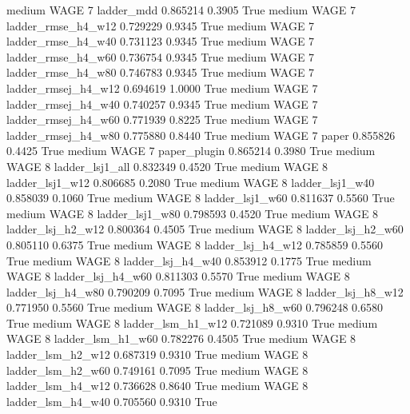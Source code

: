     medium     WAGE                 7          ladder_mdd   0.865214      0.3905    True
    medium     WAGE                 7  ladder_rmse_h4_w12   0.729229      0.9345    True
    medium     WAGE                 7  ladder_rmse_h4_w40   0.731123      0.9345    True
    medium     WAGE                 7  ladder_rmse_h4_w60   0.736754      0.9345    True
    medium     WAGE                 7  ladder_rmse_h4_w80   0.746783      0.9345    True
    medium     WAGE                 7 ladder_rmsej_h4_w12   0.694619      1.0000    True
    medium     WAGE                 7 ladder_rmsej_h4_w40   0.740257      0.9345    True
    medium     WAGE                 7 ladder_rmsej_h4_w60   0.771939      0.8225    True
    medium     WAGE                 7 ladder_rmsej_h4_w80   0.775880      0.8440    True
    medium     WAGE                 7               paper   0.855826      0.4425    True
    medium     WAGE                 7        paper_plugin   0.865214      0.3980    True
    medium     WAGE                 8     ladder_lsj1_all   0.832349      0.4520    True
    medium     WAGE                 8     ladder_lsj1_w12   0.806685      0.2080    True
    medium     WAGE                 8     ladder_lsj1_w40   0.858039      0.1060    True
    medium     WAGE                 8     ladder_lsj1_w60   0.811637      0.5560    True
    medium     WAGE                 8     ladder_lsj1_w80   0.798593      0.4520    True
    medium     WAGE                 8   ladder_lsj_h2_w12   0.800364      0.4505    True
    medium     WAGE                 8   ladder_lsj_h2_w60   0.805110      0.6375    True
    medium     WAGE                 8   ladder_lsj_h4_w12   0.785859      0.5560    True
    medium     WAGE                 8   ladder_lsj_h4_w40   0.853912      0.1775    True
    medium     WAGE                 8   ladder_lsj_h4_w60   0.811303      0.5570    True
    medium     WAGE                 8   ladder_lsj_h4_w80   0.790209      0.7095    True
    medium     WAGE                 8   ladder_lsj_h8_w12   0.771950      0.5560    True
    medium     WAGE                 8   ladder_lsj_h8_w60   0.796248      0.6580    True
    medium     WAGE                 8   ladder_lsm_h1_w12   0.721089      0.9310    True
    medium     WAGE                 8   ladder_lsm_h1_w60   0.782276      0.4505    True
    medium     WAGE                 8   ladder_lsm_h2_w12   0.687319      0.9310    True
    medium     WAGE                 8   ladder_lsm_h2_w60   0.749161      0.7095    True
    medium     WAGE                 8   ladder_lsm_h4_w12   0.736628      0.8640    True
    medium     WAGE                 8   ladder_lsm_h4_w40   0.705560      0.9310    True
